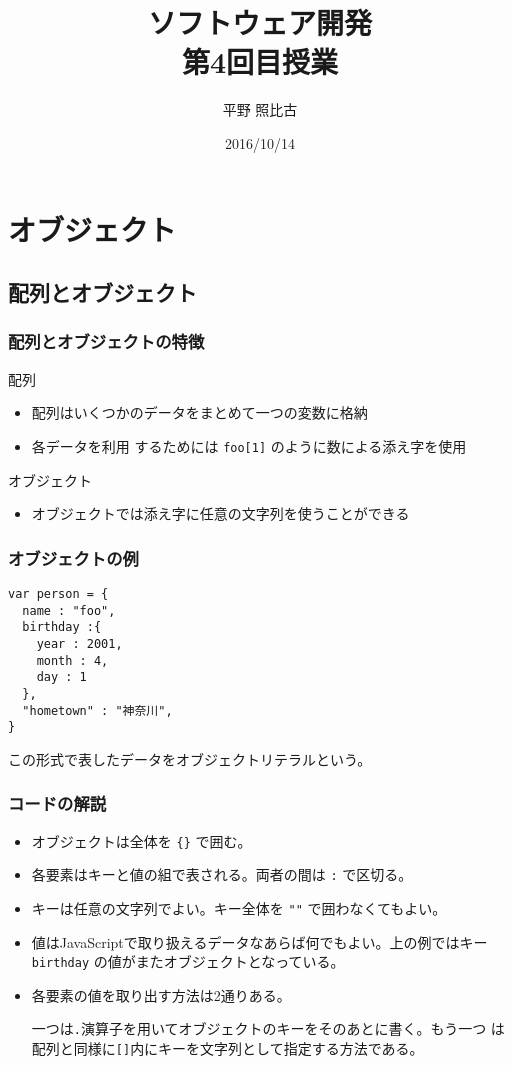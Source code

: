 
%
\title{ソフトウェア開発\\第4回目授業}
\author{平野 照比古}
\institute{}
\date{2016/10/14}

\frame{\maketitle}
\section{オブジェクト}
\subsection{配列とオブジェクト}
\begin{frame}[containsverbatim]
\frametitle{配列とオブジェクトの特徴}
配列
\begin{itemize}
 \item 配列はいくつかのデータをまとめて一つの変数に格納
 \item 各データを利用
するためには \Verb+foo[1]+ のように数による添え字を使用
\end{itemize}
オブジェクト
\begin{itemize}
 \item オブジェクトでは添え字に任意の文字列を使うことができる
\end{itemize}
\end{frame}
\begin{frame}[containsverbatim]
\frametitle{オブジェクトの例}
\begin{Verbatim}
var person = {
  name : "foo",
  birthday :{
    year : 2001,
    month : 4,
    day : 1
  },
  "hometown" : "神奈川",
}
\end{Verbatim}
この形式で表したデータをオブジェクトリテラルという。
\end{frame}
\begin{frame}[containsverbatim]
\frametitle{コードの解説}
\begin{itemize}
 \item オブジェクトは全体を \Verb+{}+ で囲む。
 \item 各要素はキーと値の組で表される。両者の間は \Verb+:+ で区切る。
 \item キーは任意の文字列でよい。キー全体を \Verb+""+ で囲わなくてもよい。
 \item 値はJavaScriptで取り扱えるデータなあらば何でもよい。上の例ではキー
       \Verb+birthday+ の値がまたオブジェクトとなっている。
 \item 各要素の値を取り出す方法は2通りある。

一つは\Verb+.+演算子を用いてオブジェクトのキーをそのあとに書く。もう一つ
       は配列と同様に\Verb+[]+内にキーを文字列として指定する方法である。
\end{itemize}
\end{frame}
